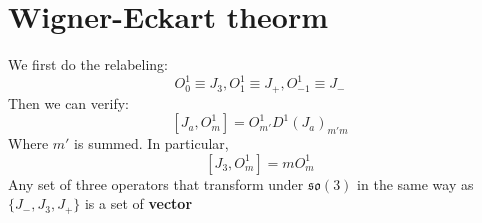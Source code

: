 \documentclass{article}
\begin{document}
	\section{Wigner-Eckart theorm}
	
	We first do the relabeling:
	\begin{equation*}
		O_{0}^{1} \equiv J_{3} ,O_{1}^{1} \equiv J_{+} ,O_{-1}^{1} \equiv J_{-}
	\end{equation*}
	Then we can verify:
	\begin{equation*}
		\left[ J_{a} ,O_{m}^{1}\right] =O_{m'}^{1} D^{1}( J_{a})_{m'm}
	\end{equation*}
	Where $m'$ is summed. In particular, 
	\begin{equation*}
		\left[ J_{3} ,O_{m}^{1}\right] =mO_{m}^{1}
	\end{equation*}
	Any set of three operators that transform under $\mathfrak{so}( 3)$ in the same way as $\{J_{-} ,J_{3} ,J_{+}\}$ is a set of \textbf{vector}
	
\end{document}
